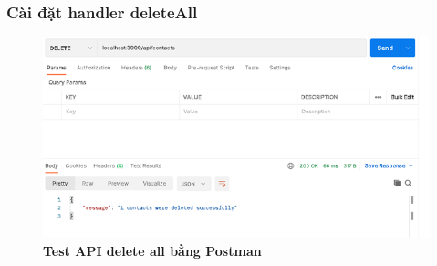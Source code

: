 \subsubsection*{Cài đặt handler deleteAll}
\begin{figure}[H]
  \centering
  \includegraphics[width=15cm]{images/chapterSecond/11.png}
  \caption{\bfseries Test API delete all bằng Postman}
\end{figure}



